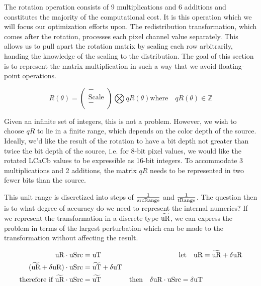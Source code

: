 The rotation operation consists of 9 multiplications and 6 additions and constitutes the majority of the computational cost. It is this operation which we will focus our optimization efforts upon. The redistribution transformation, which comes after the rotation, processes each pixel channel value separately. This allows us to pull apart the rotation matrix by scaling each row arbitrarily, handing the knowledge of the scaling to the distribution. The goal of this section is to represent the matrix multiplication in such a way that we avoid floating-point operations.

\begin{equation}\label{eq:NormRxyz4}
 R(\theta) =
\left(
\begin{array}{c}
 -  \\
 \text{Scale} \\
 -  \\
\end{array}
\right)
\bigotimes
qR(\theta)\text{where}\quad{qR(\theta)\in\mathbb{Z}}
\end{equation}

Given an infinite set of integers, this is not a problem. However, we wish to choose $qR$ to lie in a finite range, which depends on the color depth of the source. Ideally, we'd like the result of the rotation to have a bit depth not greater than twice the bit depth of the source, i.e. for 8-bit pixel values, we would like the rotated LCaCb values to be expressible as 16-bit integers. To accommodate 3 multiplications and 2 additions, the matrix $qR$ needs to be represented in two fewer bits than the source.

This unit range is discretized into steps of $\frac{1}{\text{srcRange}}$ and $\frac{1}{\text{tRange}}$. The question then is to what degree of accuracy do we need to represent the internal numerics? If we represent the transformation in a discrete type $\widetilde{\text{uR}}$, we can express the problem in terms of the largest perturbation which can be made to the transformation without affecting the result.


\begin{equation}\label{eq:lxyPixel}
\begin{aligned}
\text{uR}  \cdot \text{uSrc} &= \text{uT}  &\text{let} \quad \text{uR} &= \widetilde{\text{uR}} + \delta\text{uR} \\
(\widetilde{\text{uR}} + \delta\text{uR})  \cdot \text{uSrc} &= \widetilde{\text{uT}} + \delta\text{uT} \\
\text{therefore if } \widetilde{\text{uR}} \cdot \text{uSrc} &= \widetilde{\text{uT}} & \text{then}\quad \delta\text{uR}  \cdot \text{uSrc} = \delta\text{uT}
\end{aligned} 
\end{equation}

